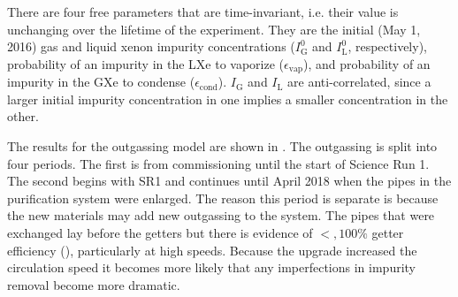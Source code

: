 There are four free parameters that are time-invariant, i.e. their value is unchanging over the lifetime of the experiment.  They are the
initial (May 1, 2016) gas and liquid xenon impurity concentrations ($I_{\mathrm{G}}^0$ and $I_{\mathrm{L}}^0$, respectively), probability of
an impurity in the LXe to vaporize ($\epsilon_{\mathrm{vap}}$), and probability of an impurity in the GXe to condense
($\epsilon_{\mathrm{cond}}$).  $I_{\mathrm{G}}$ and $I_{\mathrm{L}}$ are anti-correlated, since a larger initial impurity concentration in
one implies a smaller concentration in the other.

\bgroup
\def\arraystretch{1.2}
\begin{table}
\centering
{}
\caption{Time-dependent parameters in fit.}
\label{tab:elifetime_fit_results_posteriors_constant}
\end{table}
\egroup

The results for the outgassing model are shown in .  The outgassing is split into
four periods.  The first is from commissioning until the start of Science Run 1.  The second begins with SR1 and continues until April
2018 when the pipes in the purification system were enlarged.  The reason this period is separate is because the new materials may add
new outgassing to the system.  The pipes that were exchanged lay before the getters but there is evidence of ${<}, 100\%$ getter
efficiency (), particularly at high speeds.  Because the upgrade increased the
circulation speed it becomes more likely that any imperfections in impurity removal become more dramatic.

